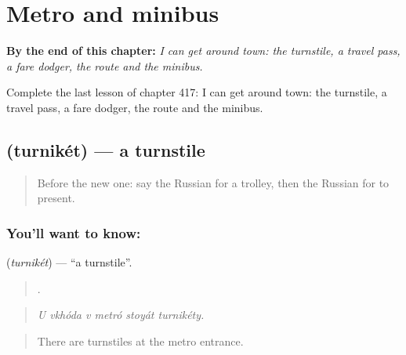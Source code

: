 
\chapter{Metro and minibus}
\label{ch:ru-metro-and-minibus}

\begin{chapteropening}
\textbf{By the end of this chapter:} \emph{I can get around town: the turnstile, a travel pass, a fare dodger, the route and the minibus.}

Complete the last lesson of chapter 417: I can get around town: the turnstile, a travel pass, a fare dodger, the route and the minibus.
\end{chapteropening}

\section[\texorpdfstring{\ru{турникет} (turnikét)}{турникет (turnikét)}]{ (turnikét) — a turnstile}

\label{lesson:RU-C417-turniket}



\begin{quote}
Before the new one: say the Russian for a trolley, then the Russian for to present.
\end{quote}

\subsection*{You'll want to know: }
\textbf{} (\emph{turnikét}) — \textquotedblleft{}a turnstile\textquotedblright{}.

\begin{quote}
     .
\end{quote}

\begin{quote}
\emph{U vkhóda v metró stoyát turnikéty.}
\end{quote}

\begin{quote}
There are turnstiles at the metro entrance.
\end{quote}

